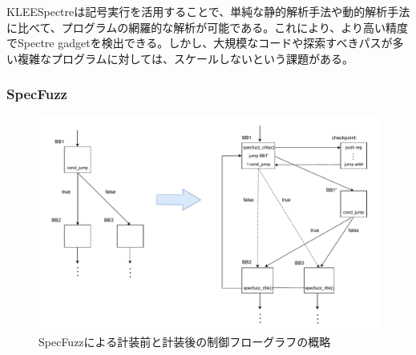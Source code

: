 KLEESpectreは記号実行を活用することで、単純な静的解析手法や動的解析手法に比べて、プログラムの網羅的な解析が可能である。これにより、より高い精度でSpectre gadgetを検出できる。しかし、大規模なコードや探索すべきパスが多い複雑なプログラムに対しては、スケールしないという課題がある。\par

\subsubsection{SpecFuzz}

\begin{figure}[tb]
  \centering
  \includegraphics[width=\linewidth]{img/specfuzz_instrument.drawio.pdf}
  \caption{SpecFuzzによる計装前と計装後の制御フローグラフの概略}
  \label{fig:specfuzz_instrument}
\end{figure}


